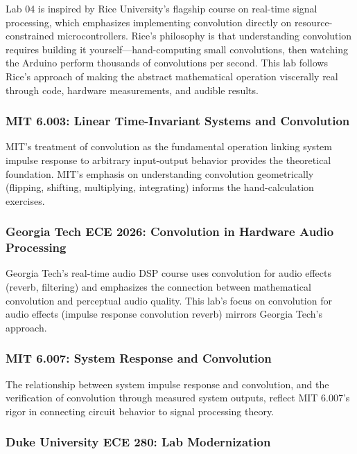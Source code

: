 \documentclass[11pt,letterpaper]{article}
\begin{document}
Lab 04 is inspired by Rice University's flagship course on real-time signal processing, which emphasizes implementing convolution directly on resource-constrained microcontrollers. Rice's philosophy is that understanding convolution requires building it yourself—hand-computing small convolutions, then watching the Arduino perform thousands of convolutions per second. This lab follows Rice's approach of making the abstract mathematical operation viscerally real through code, hardware measurements, and audible results.

\subsubsection*{MIT 6.003: Linear Time-Invariant Systems and Convolution}

MIT's treatment of convolution as the fundamental operation linking system impulse response to arbitrary input-output behavior provides the theoretical foundation. MIT's emphasis on understanding convolution geometrically (flipping, shifting, multiplying, integrating) informs the hand-calculation exercises.

\subsubsection*{Georgia Tech ECE 2026: Convolution in Hardware Audio Processing}

Georgia Tech's real-time audio DSP course uses convolution for audio effects (reverb, filtering) and emphasizes the connection between mathematical convolution and perceptual audio quality. This lab's focus on convolution for audio effects (impulse response convolution reverb) mirrors Georgia Tech's approach.

\subsubsection*{MIT 6.007: System Response and Convolution}

The relationship between system impulse response and convolution, and the verification of convolution through measured system outputs, reflect MIT 6.007's rigor in connecting circuit behavior to signal processing theory.

\subsubsection*{Duke University ECE 280: Lab Modernization}
\end{document}

